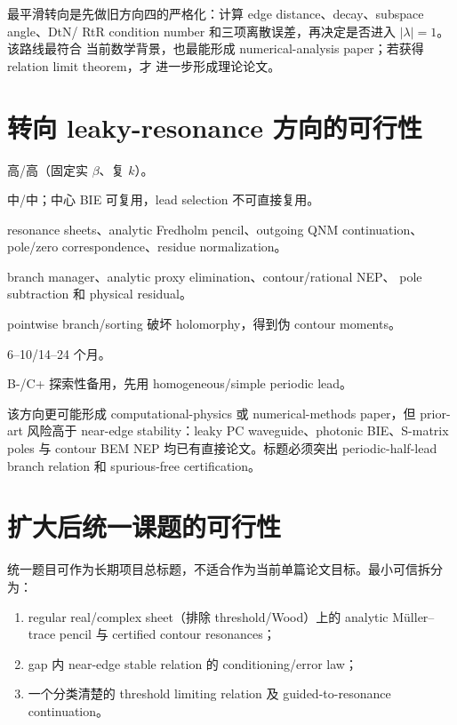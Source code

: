 \documentclass[UTF8,11pt,fontset=none]{ctexart}
\begin{document}
最平滑转向是先做旧方向四的严格化：计算 edge distance、decay、subspace angle、DtN/
RtR condition number 和三项离散误差，再决定是否进入 \(|\lambda|=1\)。该路线最符合
当前数学背景，也最能形成 numerical-analysis paper；若获得 relation limit theorem，才
进一步形成理论论文。

\section{转向 leaky-resonance 方向的可行性}

\begin{description}[style=multiline,leftmargin=4.3cm,labelwidth=4.0cm]
  \item[几何/PDE 相似性：] 高/高（固定实 \(\beta\)、复 \(k\)）。
  \item[理论/代码复用：] 中/中；中心 BIE 可复用，lead selection 不可直接复用。
  \item[新增数学：] resonance sheets、analytic Fredholm pencil、outgoing QNM
    continuation、pole/zero correspondence、residue normalization。
  \item[新增数值：] branch manager、analytic proxy elimination、contour/rational NEP、
    pole subtraction 和 physical residual。
  \item[关键失败点：] pointwise branch/sorting 破坏 holomorphy，得到伪 contour moments。
  \item[最小/完整时间：] 6--10/14--24 个月。
  \item[推荐：] B-/C+ 探索性备用，先用 homogeneous/simple periodic lead。
\end{description}

该方向更可能形成 computational-physics 或 numerical-methods paper，但 prior-art 风险高于
near-edge stability：leaky PC waveguide、photonic BIE、S-matrix poles 与 contour BEM NEP
均已有直接论文。标题必须突出 periodic-half-lead branch relation 和 spurious-free
certification。

\section{扩大后统一课题的可行性}

统一题目可作为长期项目总标题，不适合作为当前单篇论文目标。最小可信拆分为：

\begin{enumerate}
  \item regular real/complex sheet（排除 threshold/Wood）上的 analytic
    Müller--trace pencil 与 certified contour resonances；
  \item gap 内 near-edge stable relation 的 conditioning/error law；
  \item 一个分类清楚的 threshold limiting relation 及 guided-to-resonance continuation。
\end{enumerate}
\end{document}
